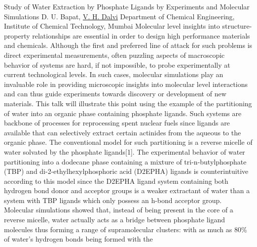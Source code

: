 
    \begin{abstract_online}{Study of Water Extraction by Phosphate Ligands by Experiments and Molecular Simulations}{%
        D. U. Bapat, \underline{V. H. Dalvi}}{%
        \IStag}{%
        Department of Chemical Engineering, Institute of Chemical Technology, Mumbai}
    Molecular level insights into structure-property relationships are essential in order to design high performance materials and chemicals. Although the first and preferred line of attack for such problems is direct experimental measurements, often puzzling aspects of macroscopic behavior of systems are hard, if not impossible, to probe experimentally at current technological levels. In such cases, molecular simulations play an invaluable role in providing microscopic insights into molecular level interactions and can thus guide experiments towards discovery or development of new materials.  This talk will illustrate this point using the example of the partitioning of water into an organic phase containing phosphate ligands. Such systems are backbone of processes for reprocessing spent nuclear fuels since ligands are available that can selectively extract certain actinides from the aqueous to the organic phase.  The conventional model for such partitioning is a reverse micelle of water solvated by the phosphate ligands[1]. The experimental behavior of water partitioning into a dodecane phase containing a mixture of tri-n-butylphosphate (TBP) and di-2-ethylhexylphosphoric acid (D2EPHA) ligands is counterintuitive according to this model since the D2EPHA ligand system containing both hydrogen bond donor and acceptor groups is a weaker extractant of water than a system with TBP ligands which only possess an h-bond acceptor group. Molecular simulations showed that, instead of being present in the core of a reverse micelle, water actually acts as a bridge between phosphate ligand molecules thus forming a range of supramolecular clusters: with as much as $80 \%$ of water’s hydrogen bonds being formed with the 
\end{abstract_online}
